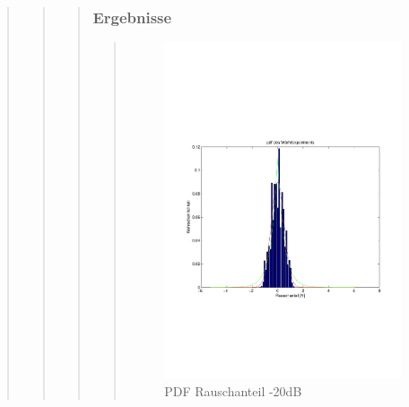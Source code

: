 \begin{quote}
\begin{quote}
\begin{quote}
        \subsubsection{Ergebnisse}
		\begin{quote}
		
		\begin{figure}[H]
        \centering
            \includegraphics[scale=0.6, trim = 1cm 6.5cm 1cm 7.5cm, clip]{./Bilder/PDFRauschen-20dB}
                \caption{PDF Rauschanteil -20dB}
        \end{figure}
        

\end{quote}
\end{quote}
\end{quote}
\end{quote}
